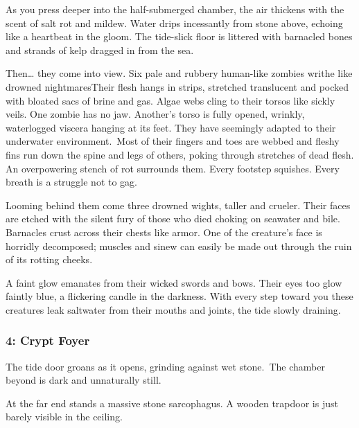 \documentclass[10pt,twocolumn]{article}
\let\oldtextbf\textbf
\renewcommand{\textbf}[1]{\oldtextbf{{#1}}}
\renewenvironment{quote}
  {%
    \begingroup
      \setlength{\parindent}{1em}%
      \setlength{\parskip}{0pt}%
      \begin{tcolorbox}[myquote,
        before upper={%
          \let\textbf\oldtextbf
          \setlength{\parindent}{1.5em}%
          \setlength{\parskip}{0pt}%
          \noindent              %
        }%
      ]%
  }
  {%
      \end{tcolorbox}%
    \endgroup
  }
\begin{document}
\begin{quote}
As you press deeper into the half-submerged chamber, the air thickens
with the scent of salt rot and mildew. Water drips incessantly from
stone above, echoing like a heartbeat in the gloom. The tide-slick floor
is littered with barnacled bones and strands of kelp dragged in from the
sea.~

Then\ldots{} they come into view. Six pale and rubbery human-like
zombies writhe like drowned nightmaresTheir flesh hangs in strips,
stretched translucent and pocked with bloated sacs of brine and gas.
Algae webs cling to their torsos like sickly veils. One zombie has no
jaw. Another's torso is fully opened, wrinkly, waterlogged viscera
hanging at its feet. They have seemingly adapted to their underwater
environment.~Most of their fingers and toes are webbed and fleshy fins
run down the spine and legs of others, poking through stretches of dead
flesh. An overpowering stench of rot surrounds them. Every footstep
squishes. Every breath is a struggle not to gag.~

Looming behind them come three drowned wights, taller and crueler. Their
faces are etched with the silent fury of those who died choking on
seawater and bile. Barnacles crust across their chests like armor. One
of the creature's face is horridly decomposed; muscles and sinew can
easily be made out through the ruin of its rotting cheeks.

A faint glow emanates from their wicked swords and bows. Their eyes too
glow faintly blue, a flickering candle in the darkness. With every step
toward you these creatures leak saltwater from their mouths and joints,
the tide slowly draining.
\end{quote}

\subsubsection{4: Crypt Foyer}\label{crypt-foyer}

\begin{quote}
The tide door groans as it opens, grinding against wet stone.~The
chamber beyond is dark and unnaturally still.~

At the far end stands a massive stone sarcophagus. A wooden trapdoor is
just barely visible in the ceiling.
\end{quote}
\end{document}
